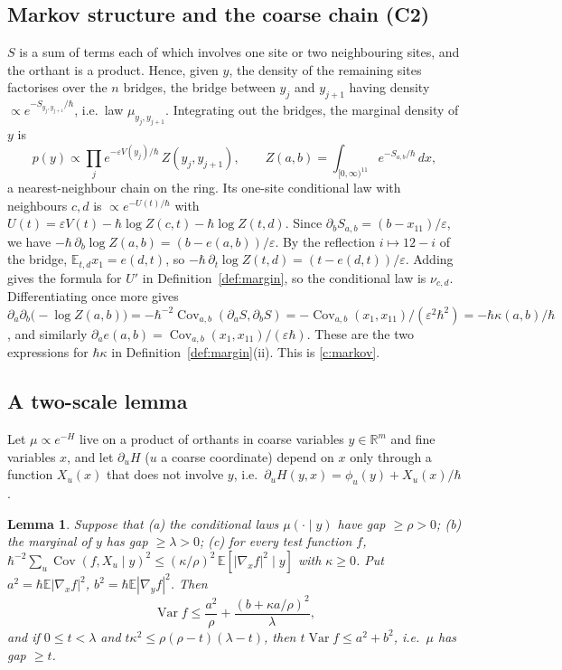\documentclass[11pt,a4paper]{article}
\newtheorem{lemma}[theorem]{Lemma}
\theoremstyle{definition}
\theoremstyle{remark}
\newcommand{\hk}{\hbar\kappa}
\newcommand{\E}{\mathbb{E}}
\DeclareMathOperator{\Cov}{Cov}
\DeclareMathOperator{\Var}{Var}
\begin{document}
\subsection{Markov structure and the coarse chain (C2)}\label{app:markov}
$S$ is a sum of terms each of which involves one site or two neighbouring sites, and the orthant is a product. Hence, given $y$, the density of the remaining sites factorises over the $n$ bridges, the bridge between $y_j$ and $y_{j+1}$ having density $\propto e^{-S_{y_j,y_{j+1}}/\hbar}$, i.e.\ law $\mu_{y_j,y_{j+1}}$. Integrating out the bridges, the marginal density of $y$ is
\[
p(y)\propto\prod_j e^{-\varepsilon V(y_j)/\hbar}\,Z(y_j,y_{j+1}),\qquad Z(a,b)=\int_{[0,\infty)^{11}}e^{-S_{a,b}/\hbar}\,dx,
\]
a nearest-neighbour chain on the ring. Its one-site conditional law with neighbours $c,d$ is $\propto e^{-U(t)/\hbar}$ with $U(t)=\varepsilon V(t)-\hbar\log Z(c,t)-\hbar\log Z(t,d)$. Since $\partial_bS_{a,b}=(b-x_{11})/\varepsilon$, we have $-\hbar\,\partial_b\log Z(a,b)=(b-e(a,b))/\varepsilon$. By the reflection $i\mapsto12-i$ of the bridge, $\E_{t,d}x_1=e(d,t)$, so $-\hbar\,\partial_t\log Z(t,d)=(t-e(d,t))/\varepsilon$. Adding gives the formula for $U'$ in Definition~\ref{def:margin}, so the conditional law is $\nu_{c,d}$. Differentiating once more gives $\partial_a\partial_b\bigl(-\log Z(a,b)\bigr)=-\hbar^{-2}\Cov_{a,b}(\partial_aS,\partial_bS)=-\Cov_{a,b}(x_1,x_{11})/(\varepsilon^2\hbar^2)=-\hk(a,b)/\hbar$, and similarly $\partial_ae(a,b)=\Cov_{a,b}(x_1,x_{11})/(\varepsilon\hbar)$. These are the two expressions for $\hk$ in Definition~\ref{def:margin}(ii). This is \ref{c:markov}.

\subsection{A two-scale lemma}\label{app:lemma}
Let $\mu\propto e^{-H}$ live on a product of orthants in coarse variables $y\in\mathbb R^m$ and fine variables $x$, and let $\partial_uH$ ($u$ a coarse coordinate) depend on $x$ only through a function $X_u(x)$ that does not involve $y$, i.e.\ $\partial_uH(y,x)=\phi_u(y)+X_u(x)/\hbar$.

\begin{lemma}\label{lem:twoscale}
Suppose that (a) the conditional laws $\mu(\cdot\mid y)$ have gap $\ge\rho>0$; (b) the marginal of $y$ has gap $\ge\lambda>0$; (c) for every test function $f$, $\hbar^{-2}\sum_u\Cov(f,X_u\mid y)^2\le(\kappa/\rho)^2\,\E[|\nabla_xf|^2\mid y]$ with $\kappa\ge0$. Put $a^2=\hbar\E|\nabla_xf|^2$, $b^2=\hbar\E|\nabla_yf|^2$. Then
\[
\Var f\le\frac{a^2}{\rho}+\frac{(b+\kappa a/\rho)^2}{\lambda},
\]
and if $0\le t<\lambda$ and $t\kappa^2\le\rho(\rho-t)(\lambda-t)$, then $t\Var f\le a^2+b^2$, i.e.\ $\mu$ has gap $\ge t$.
\end{lemma}
\end{document}
